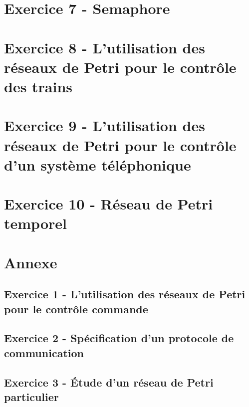 \documentclass[a4paper,11pt]{article}
\begin{document}
\section{Exercice 7 - Semaphore}



\section{Exercice 8 - L'utilisation des réseaux de Petri pour le contrôle des trains}



\section{Exercice 9 - L'utilisation des réseaux de Petri pour le contrôle d'un système téléphonique}



\section{Exercice 10 - Réseau de Petri temporel}



\section{Annexe}
\subsection{Exercice 1 - L'utilisation des réseaux de Petri pour le contrôle commande}



\subsection{Exercice 2 - Spécification d'un protocole de communication}



\subsection{Exercice 3 - Étude d'un réseau de Petri particulier}




\end{document}
